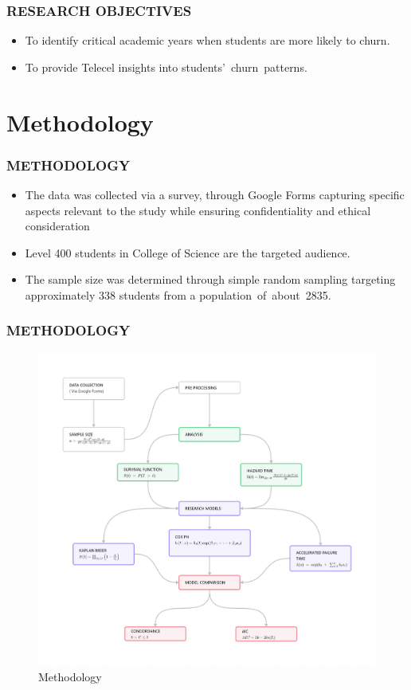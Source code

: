 \documentclass{beamer}
\begin{document}
	\begin{frame}
		\frametitle{RESEARCH OBJECTIVES}
		\begin{itemize}
			\item  To identify critical academic years when students are more likely to churn.

			\item To provide Telecel insights into students' churn patterns.
		\end{itemize}
    
    \end{frame}
	\section{Methodology}
	
	
	
	\begin{frame}
		\frametitle{METHODOLOGY}
		\begin{itemize}
			\item The data was collected via a survey, through Google Forms capturing specific aspects relevant to the study while ensuring confidentiality and ethical consideration
		
			\item Level 400 students in College of Science are the targeted audience. 
			\item The sample size was determined through simple random sampling targeting approximately 338 students from a population of about 2835.
   	\end{itemize}
    \end{frame}


	\begin{frame}
		\frametitle{METHODOLOGY}
\begin{figure}
    \centering
      \caption{Methodology}
    \includegraphics[width=0.65\linewidth]{Presentation/Methodology.png}
  
    \label{fig:enter-label}
\end{figure}

	\end{frame}
	
\end{document}
